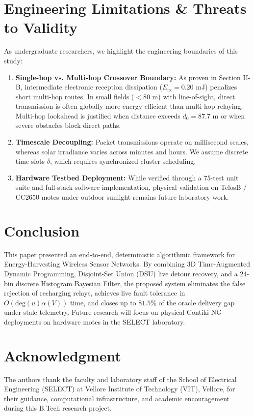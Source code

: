 \documentclass[journal]{IEEEtran}
\begin{document}
\section{Engineering Limitations \& Threats to Validity}
As undergraduate researchers, we highlight the engineering boundaries of this study:
\begin{enumerate}
    \item \textbf{Single-hop vs. Multi-hop Crossover Boundary:} As proven in Section II-B, intermediate electronic reception dissipation ($E_{\text{rx}} = 0.20\text{ mJ}$) penalizes short multi-hop routes. In small fields ($< 80\text{ m}$) with line-of-sight, direct transmission is often globally more energy-efficient than multi-hop relaying. Multi-hop lookahead is justified when distance exceeds $d_0 = 87.7\text{ m}$ or when severe obstacles block direct paths.
    \item \textbf{Timescale Decoupling:} Packet transmissions operate on millisecond scales, whereas solar irradiance varies across minutes and hours. We assume discrete time slots $\delta$, which requires synchronized cluster scheduling.
    \item \textbf{Hardware Testbed Deployment:} While verified through a 75-test unit suite and full-stack software implementation, physical validation on TelosB / CC2650 motes under outdoor sunlight remains future laboratory work.
\end{enumerate}

\section{Conclusion}
This paper presented an end-to-end, deterministic algorithmic framework for Energy-Harvesting Wireless Sensor Networks. By combining 3D Time-Augmented Dynamic Programming, Disjoint-Set Union (DSU) live detour recovery, and a 24-bin discrete Histogram Bayesian Filter, the proposed system eliminates the false rejection of recharging relays, achieves live fault tolerance in $O(\text{deg}(u)\alpha(V))$ time, and closes up to $81.5\%$ of the oracle delivery gap under stale telemetry. Future research will focus on physical Contiki-NG deployments on hardware motes in the SELECT laboratory.

\section*{Acknowledgment}
The authors thank the faculty and laboratory staff of the School of Electrical Engineering (SELECT) at Vellore Institute of Technology (VIT), Vellore, for their guidance, computational infrastructure, and academic encouragement during this B.Tech research project.
\end{document}
